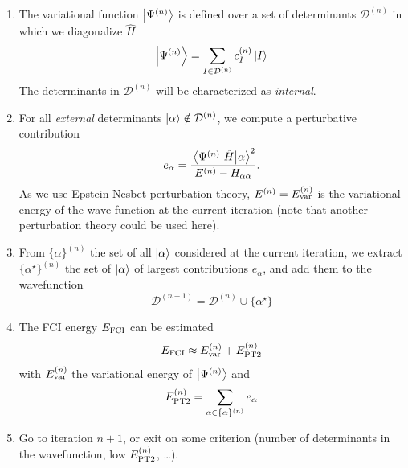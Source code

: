 \documentclass[./thesis.tex]{subfiles}
\begin{document}
\begin{enumerate}
\item

The variational function $\ket {\Psi^{(n)}}$ is defined over a set of determinants $  \mathcal{D}^{(n)}$ in which we diagonalize $\widehat{H}$
\begin{equation}
\ket{\Psi^{(n)}} = \sum_{I \in \mathcal{D}^{(n)}} c_I^{(n)} \ket{I}
\end{equation}
The determinants in $\mathcal{D}^{(n)}$ will be characterized as \emph{internal}.

\item
For all \emph{external} determinants ${\ket{\alpha}} \notin \mathcal{D}^{(n)}$, we compute a perturbative contribution
\begin{equation}
e_\alpha = \frac{\mel{\Psi^{(n)}}{\hat{H}}{\alpha}^2}{E^{(n)} - H_{\alpha \alpha}}.
\end{equation}
As we use Epstein-Nesbet perturbation theory, $E^{(n)}=E_\text{var}^{(n)}$ is the variational energy of the wave  function at the current iteration (note that another perturbation theory could be used here).

\item
From $\{ \alpha \}^{(n)}$ the set of all ${\ket{\alpha}}$ considered at the current iteration, we extract $\{ \alpha^\star \}^{(n)}$ the set of ${\ket{\alpha}}$ of largest contributions $e_\alpha$, and add them to the wavefunction
\begin{equation}
\mathcal{D}^{(n+1)} = \mathcal{D}^{(n)} \cup \{ \alpha^\star \}
\end{equation}

\item
The FCI energy $E_\text{FCI}$ can be estimated
\begin{equation}
E_\text{FCI} \approx E_\text{var}^{(n)} + E_\text{PT2}^{(n)}
\end{equation}
with $E_\text{var}^{(n)}$ the variational energy of $\ket {\Psi^{(n)}}$ and
\begin{equation}
E_\text{PT2}^{(n)} = \sum_{\alpha \in \{\alpha \}^{(n)}} e_\alpha
\end{equation}

\item
Go to iteration $n+1$, or exit on some criterion (number of determinants in the wavefunction, low $E_\text{PT2}^{(n)}$, \dots).

\end{enumerate}
\end{document}
